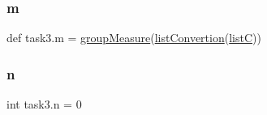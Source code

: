 \mbox{\label{namespacetask3_ac93936462cbd3bcd1b57b0770e3e565f}} 
\subsubsection{\texorpdfstring{m}{m}}
{\footnotesize\ttfamily def task3.\+m = \hyperlink{namespacetask3_a6b40d0f4ac3da0b51afd77ef157756b4}{group\+Measure}(\hyperlink{namespacetask3_abba7e8af5c5248ae896e372877accedc}{list\+Convertion}(\hyperlink{namespacetask3_a3318227cad6d17b510fe2bf8cf087ddd}{listC}))}

\mbox{\label{namespacetask3_ad2c2b323bd5691b0b9b284d8d7d7cbd1}} 
\subsubsection{\texorpdfstring{n}{n}}
{\footnotesize\ttfamily int task3.\+n = 0}

